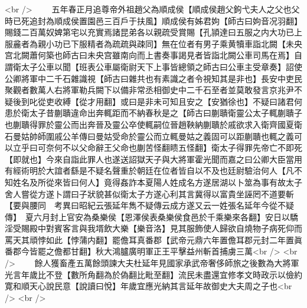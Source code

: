 <br />
　　五年春正月追尊帝外祖趙父為順成侯【順成侯趙父鉤弋夫人之父也父時已死追封為順成侯置園邑三百戶于扶風】順成侯有姊君姁【師古曰姁音况羽翻】賜錢二百萬奴婢第宅以充實焉諸昆弟各以親疏受賞賜【孔頴達曰五服之内大功已上服麄者為親小功已下服精者為疏疏與疎同】無在位者有男子乘黄犢車詣北闕【未央宫北闕蕭何築也師古曰未央宫雖南向而上書奏事謁見者皆詣北闕公車司馬在焉】自謂衛太子公車以聞【班表公車屬衛尉天下上事皆總領之師古曰公車主受章奏】詔使公卿將軍中二千石雜識視【師古曰雜共也有素識之者令視知其是非也】長安中吏民聚觀者數萬人右將軍勒兵闕下以備非常丞相御史中二千石至者並莫敢發言京兆尹不疑後到叱從吏收縛【從才用翻】或曰是非未可知且安之【安猶徐也】不疑曰諸君何患於衛太子昔蒯聵違命出奔輒距而不納春秋是之【師古曰蒯聵衛靈公太子輒蒯聵子也蒯聵得罪於靈公而出奔晉及靈公卒使輒嗣位晉趙鞅納蒯聵於戚欲求入衛齊國夏衛石曼姑帥師圍戚公羊傳曰曼姑受命於靈公而立輒曼姑之義固可以距蒯聵也輒之義可以立乎曰可奈何不以父命辭王父命也蒯苦怪翻瞆五怪翻】衛太子得罪先帝亡不即死【即就也】今來自詣此罪人也遂送詔獄天子與大將軍霍光聞而嘉之曰公卿大臣當用有經術明於大誼者繇是不疑名聲重於朝廷在位者皆自以不及也廷尉驗治何人【凡不知姓名及所從來皆曰何人】竟得姦詐本夏陽人姓成名方遂居湖以卜筮為事有故太子舍人嘗從方遂卜謂曰子狀貌甚似衛太子方遂心利其言冀得以富貴坐誣罔不道要斬【要與腰同　考異曰昭紀云張延年雋不疑傳云成方遂又云一姓張名延年今從不疑傳】　夏六月封上官安為桑樂侯【恩澤侯表桑樂侯食邑於千乘樂來各翻】安日以驕淫受賜殿中對賓客言與我壻飲大樂【樂音洛】見其服飾使人歸欲自燒物子病死仰而罵天其頑悖如此【悖蒲内翻】罷儋耳真番郡【武帝元鼎六年置儋耳郡元封二年置眞番郡今皆罷之儋都甘翻】秋大鴻臚廣明軍正王平擊益州斬首捕虜三萬<br />
<br />
　　餘人獲畜產五萬餘頭諫大夫杜延年見國家承武帝奢侈師旅之後數為大將軍光言年歲比不登【數所角翻為於偽翻比毗至翻】流民未盡還宜修孝文時政示以儉約寛和順天心說民意【說讀曰悅】年歲宜應光納其言延年故御史大夫周之子也<br />
<br />
